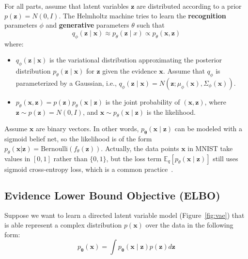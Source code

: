 {For all parts, assume that latent variables $\mathbf{z}$ are distributed according to a prior $p(\mathbf{z}) = N(0, I)$. The Helmholtz machine tries to learn the \textbf{recognition} parameters $\phi$ and \textbf{generative} parameters $\theta$ such that $$
q_\phi(\mathbf{z} \mid \mathbf{x}) \approx p_\theta(\mathbf{z} \mid x) \propto p_\theta(\mathbf{x}, \mathbf{z})
$$
where:
\begin{itemize}
    \item $q_\phi(\mathbf{z} \mid \mathbf{x})$ is the variational distribution approximating the posterior distribution $p_\theta(\mathbf{z} \mid \mathbf{x})$ for $\mathbf{z}$ given the evidence $\mathbf{x}$. Assume that $q_\phi$ is parameterized by a Gaussian, i.e., $q_\phi(\mathbf{z} \mid \mathbf{x}) = N(\mathbf{z}; \mu_\phi(\mathbf{x}), \Sigma_\phi (\mathbf{x}))$.
    \item $p_\theta(\mathbf{x}, \mathbf{z}) = p(\mathbf{z}) p_\theta(\mathbf{x} \mid \mathbf{z})$ is the joint probability of $(\mathbf{x}, \mathbf{z})$, where $\mathbf{z} \sim p(\mathbf{z})=N(0,I)$, and $\mathbf{x} \sim p_\theta(\mathbf{x} \mid \mathbf{z})$ is the likelihood.
\end{itemize}
} %

Assume $\mathbf{x}$ are binary vectors. In other words, $p_{\boldsymbol \theta}(\mathbf{x} \mid \mathbf{z})$ can be modeled with a sigmoid belief net, so the likelihood is of the form $p_\theta(\mathbf{x}|\mathbf{z}) = \text{Bernoulli}( f_\theta (\mathbf{z}) )$. Actually, the data points $\mathbf{x}$ in MNIST take values in $[0, 1]$ rather than $\{ 0, 1\}$, but the loss term $\mathbb{E}_{q}[p_\theta(\mathbf{x} \mid \mathbf{z})]$ still uses sigmoid cross-entropy loss, which is a common practice~\cite{doersch2016tutorial}.

\subsection{Evidence Lower Bound Objective (ELBO)} \label{section:1-elbo}

Suppose we want to learn a directed latent variable model (Figure~\ref{fig:vae}) that is able represent a complex distribution $p(\mathbf{x})$  over the data in the following form:
\begin{equation}
    p_{\boldsymbol \theta}(\mathbf{x}) = \int p_{\boldsymbol \theta}(\mathbf{x} \mid \mathbf{z}) p(\mathbf{z}) d\mathbf{z}
\end{equation}

